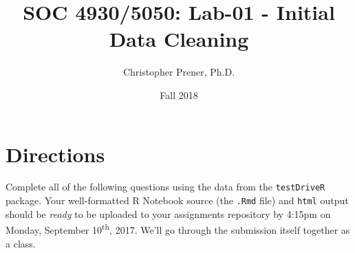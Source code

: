 \documentclass{tufte-handout}
\title{SOC 4930/5050: Lab-01 - Initial Data Cleaning }
\author{Christopher Prener, Ph.D.}
\date{Fall 2018}
\begin{document}
\maketitle %

\section{Directions}
Complete all of the following questions using the data from the \texttt{testDriveR} package. Your well-formatted R Notebook source (the \texttt{.Rmd} file) and \texttt{html} output should be \textit{ready} to be uploaded to your assignments repository by 4:15pm on Monday, September 10\textsuperscript{th}, 2017. We'll go through the submission itself together as a class.

\vspace{5mm}
\end{document}
